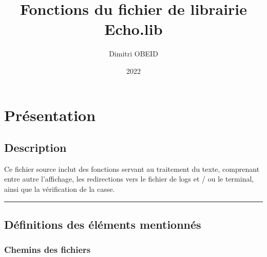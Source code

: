 \documentclass[a4paper,10pt]{article}
\title{\color{sec1}Fonctions du fichier de librairie \color{path}Echo.lib}\color{text}
\author{Dimitri OBEID}
\date{2022}
\begin{document}
\maketitle
\newpage

\hypertarget{contents}{}
\tableofcontents
\newpage

\color{sec1}
\section{Présentation}\color{text}

\color{sec2}
\subsection{Description}\color{text}

\begin{justify}
    Ce fichier source inclut des fonctions servant au traitement du texte, comprenant entre autre l'affichage, les redirections vers le fichier de logs et / ou le terminal, ainsi que la vérification de la casse.
\end{justify}




\color{sec2}\par\noindent\rule{\textwidth}{0.4pt}\color{text}

\color{sec2}
\subsection{Définitions des éléments mentionnés}\color{text}

\color{sec3}
\subsubsection{Chemins des fichiers}\color{text}
\end{document}
